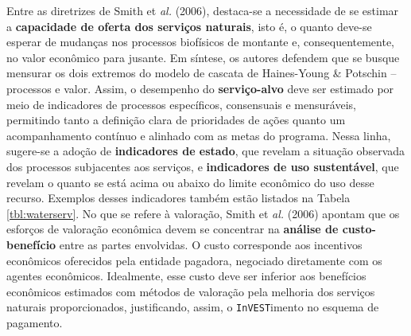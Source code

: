 \documentclass[./main.tex]{subfiles}
\begin{document}
\par Entre as diretrizes de Smith et \textit{al.} (2006), destaca-se a necessidade de se estimar a \textbf{capacidade de oferta dos serviços naturais}, isto é, o quanto deve-se esperar de mudanças nos processos biofísicos de montante e, consequentemente, no valor econômico para jusante. Em síntese, os autores defendem que se busque mensurar os dois extremos do modelo de cascata de Haines-Young \& Potschin -- processos e valor. Assim, o desempenho do \textbf{serviço-alvo} deve ser estimado por meio de indicadores de processos específicos, consensuais e mensuráveis, permitindo tanto a definição clara de prioridades de ações quanto um acompanhamento contínuo e alinhado com as metas do programa. Nessa linha, sugere-se a adoção de \textbf{indicadores de estado}, que revelam a situação observada dos processos subjacentes aos serviços, e \textbf{indicadores de uso sustentável}, que revelam o quanto se está acima ou abaixo do limite econômico do uso desse recurso. Exemplos desses indicadores também estão listados na Tabela \ref{tbl:waterserv}. No que se refere à valoração, Smith et \textit{al.} (2006) apontam que os esforços de valoração econômica devem se concentrar na \textbf{análise de custo-benefício} entre as partes envolvidas. O custo corresponde aos incentivos econômicos oferecidos pela entidade pagadora, negociado diretamente com os agentes econômicos. Idealmente, esse custo deve ser inferior aos benefícios econômicos estimados com métodos de valoração pela melhoria dos serviços naturais proporcionados, justificando, assim, o \texttt{InVEST}imento no esquema de pagamento. 
\end{document}
